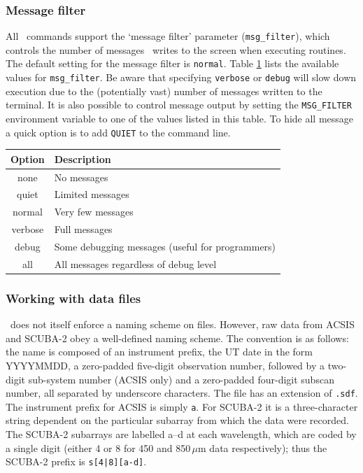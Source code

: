 \documentclass[oneside,11pt]{starlink}
\begin{document}
\subsubsection{Message filter}

All \SMURF\ commands support the `message filter' parameter
(\verb+msg_filter+), which controls the number of messages \SMURF\
writes to the screen when executing routines. The default setting for
the message filter is \verb+normal+. Table \ref{tab:msgfilter} lists
the available values for \verb+msg_filter+. Be aware that specifying
\verb+verbose+ or \verb+debug+ will slow down execution due to the
(potentially vast) number of messages written to the terminal. It is
also possible to control message output by setting the
\verb+MSG_FILTER+ environment variable to one of the values listed in
this table. To hide all message a quick option is to add \verb+QUIET+
to the command line.

\begin{table}
\centering
\begin{tabular}{|c|l|}
\hline
Option  & Description \\
\hline
none    & No messages \\
quiet   & Limited messages \\
normal  & Very few messages \\
verbose & Full messages \\
debug   & Some debugging messages (useful for programmers) \\
all     & All messages regardless of debug level \\
\hline
\end{tabular}
\label{tab:msgfilter}
\end{table}

\subsubsection{Working with data files\label{se:files}}

\SMURF\ does not itself enforce a naming scheme on files. However, raw
data from ACSIS and SCUBA-2 obey a well-defined naming scheme. The
convention is as follows: the name is composed of an instrument
prefix, the UT date in the form YYYYMMDD, a zero-padded five-digit
observation number, followed by a two-digit sub-system number (ACSIS
only) and a zero-padded four-digit subscan number, all separated by
underscore characters. The file has an extension of \verb+.sdf+. The
instrument prefix for ACSIS is simply \verb+a+. For SCUBA-2 it is a
three-character string dependent on the particular subarray from which
the data were recorded. The SCUBA-2 subarrays are labelled a--d at
each wavelength, which are coded by a single digit (either 4 or 8 for
450 and 850\,$\mu$m data respectively); thus the SCUBA-2 prefix is
\verb+s[4|8][a-d]+.
\end{document}
